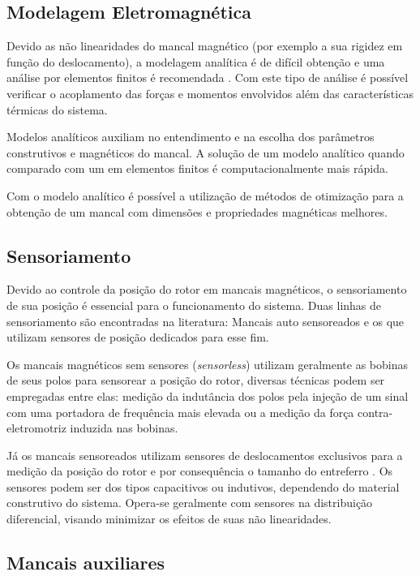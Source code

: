\subsection{Modelagem Eletromagnética}

Devido as não linearidades do mancal magnético (por exemplo a sua rigidez em função do deslocamento), a modelagem analítica é de difícil obtenção e uma análise por elementos finitos é recomendada \citep{pilat2007automatic}. Com este tipo de análise é possível verificar o acoplamento das forças e momentos envolvidos além das características térmicas do sistema.

Modelos analíticos \cite{Tezuka2013, Chiba} auxiliam no entendimento e na escolha dos parâmetros construtivos e magnéticos do mancal. A solução de um modelo analítico quando comparado com um em elementos finitos é computacionalmente mais rápida.

Com o modelo analítico é possível a utilização de métodos de otimização  para a obtenção de um mancal com dimensões e propriedades magnéticas melhores. 

\subsection{Sensoriamento}

Devido ao controle da posição do rotor em mancais magnéticos, o sensoriamento de sua posição é essencial para o funcionamento do sistema. Duas linhas de sensoriamento são encontradas na literatura: Mancais auto sensoreados \citep{Vischer1993} e os que utilizam sensores de posição dedicados para esse fim.

Os mancais magnéticos sem sensores (\textit{sensorless}) utilizam geralmente as bobinas de seus polos para sensorear a posição do rotor, diversas técnicas podem ser empregadas \citep{Hofer2009a, Mukhopadhyay2005} entre elas: medição da indutância dos polos pela injeção de um sinal com uma portadora de frequência mais elevada ou a medição da força contra-eletromotriz induzida nas bobinas.
 
Já os mancais sensoreados utilizam sensores de deslocamentos exclusivos para a medição da posição do rotor e por consequência o tamanho do entreferro \cite{boehm1993sensors}. Os sensores podem ser dos tipos capacitivos ou indutivos, dependendo do material construtivo do sistema. Opera-se geralmente com sensores na distribuição diferencial, visando minimizar os efeitos de suas não linearidades.
 
\subsection{Mancais auxiliares}

